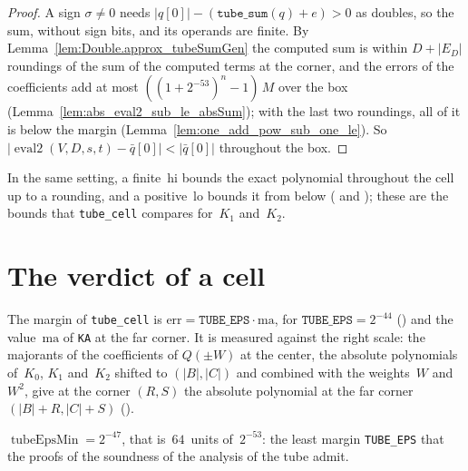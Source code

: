 \begin{proof}
  \leanok
  A sign $\sigma \ne 0$ needs $|q[0]| - (\mathtt{tube\_sum}(q) + e) > 0$ as doubles, so the sum,
  without sign bits, and its operands are finite. By Lemma~\ref{lem:Double.approx_tubeSumGen} the
  computed sum is within $D + |E_D|$ roundings of the sum of the computed terms at the corner, and
  the errors of the coefficients add at most $((1 + 2^{-53})^n - 1)\, M$ over the box
  (Lemma~\ref{lem:abs_eval2_sub_le_absSum}); with the last two roundings, all of it is below the
  margin (Lemma~\ref{lem:one_add_pow_sub_one_le}). So
  $|\operatorname{eval2}(V, D, s, t) - \bar q[0]| < |\bar q[0]|$ throughout the box.
\end{proof}

In the same setting, a finite~$\mathrm{hi}$ bounds the exact polynomial throughout the cell up to
a rounding, and a positive~$\mathrm{lo}$ bounds it from below
( and
); these are the bounds that
\texttt{tube\_cell} compares for~$K_1$ and~$K_2$.

\section{The verdict of a cell}\label{sec:tubeVerdict}

The margin of \texttt{tube\_cell} is $\mathrm{err} = \mathtt{TUBE\_EPS} \cdot \mathrm{ma}$, for
$\mathtt{TUBE\_EPS} = 2^{-44}$ () and the
value~$\mathrm{ma}$ of \texttt{KA} at the far corner. It is measured against the right scale: the
majorants of the coefficients of $Q(\pm W)$ at the center, the absolute polynomials of~$K_0$, $K_1$
and~$K_2$ shifted to $(|B|, |C|)$ and combined with the weights~$W$ and~$W^2$, give at the corner
$(R, S)$ the absolute polynomial at the far corner $(|B| + R, |C| + S)$
().

\begin{definition}\label{def:tubeEpsMin}
  \leanok
  $\operatorname{tubeEpsMin} = 2^{-47}$, that is~$64$~units of~$2^{-53}$: the least margin
  \texttt{TUBE\_EPS} that the proofs of the soundness of the analysis of the tube admit.
\end{definition}

